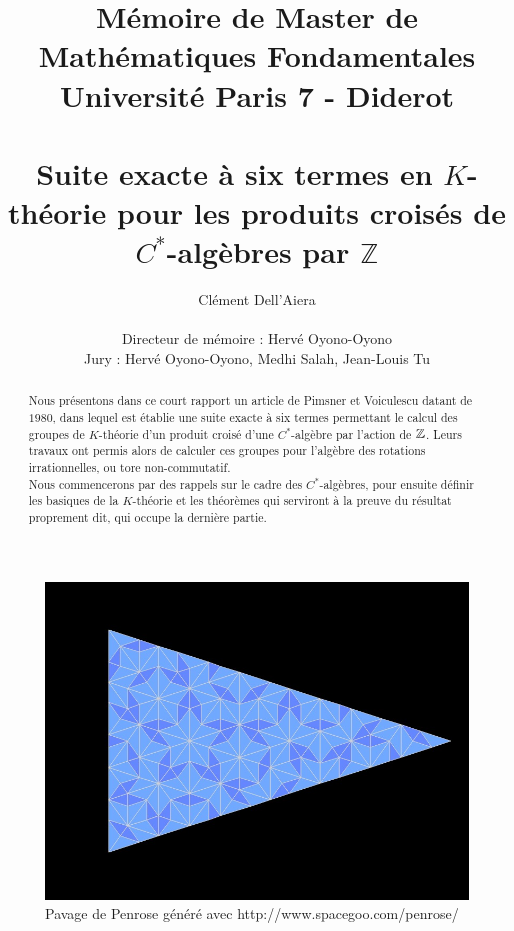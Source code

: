 \documentclass[a4paper]{article}
\title{Mémoire de Master de Mathématiques Fondamentales \\ Université Paris 7 - Diderot \\ ~ \\
\textbf{Suite exacte à six termes en $K$-théorie pour les produits croisés de $C^*$-algèbres par $\mathbb Z$}}
\date{}
\author{ Clément Dell'Aiera \\ \\ Directeur de mémoire : Hervé Oyono-Oyono \\ Jury : Hervé Oyono-Oyono, Medhi Salah, Jean-Louis Tu }
\begin{document}
\maketitle
\begin{figure}[h]\centering
\includegraphics[scale=0.4]{Penrose.png}
\caption{Pavage de Penrose généré avec http://www.spacegoo.com/penrose/}
\label{fig:Penrose}
\end{figure}

\newpage
\begin{abstract}
Nous présentons dans ce court rapport un article de Pimsner et Voiculescu datant de $1980$, dans lequel est établie une suite exacte à six termes permettant le calcul des groupes de $K$-théorie d'un produit croisé d'une $C^*$-algèbre par l'action de $\mathbb Z$. Leurs travaux ont permis alors de calculer ces groupes pour l'algèbre des rotations irrationnelles, ou tore non-commutatif.\\
Nous commencerons par des rappels sur le cadre des $C^*$-algèbres, pour ensuite définir les basiques de la $K$-théorie et les théorèmes qui serviront à la preuve du résultat proprement dit, qui occupe la dernière partie. 
\end{abstract}
\tableofcontents

\newpage







%

%


 
\nocite{*}
\end{document}
